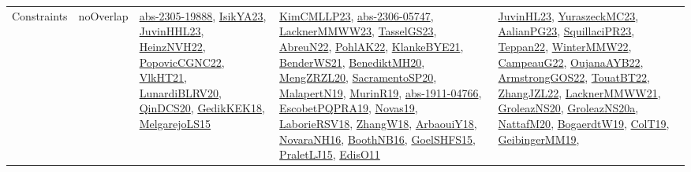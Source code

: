 {\begin{longtable}{lp{3cm}>{\raggedright}p{6cm}>{\raggedright}p{6cm}p{8cm}}
Constraints & noOverlap & \href{articles/abs-2305-19888.pdf}{abs-2305-19888}\cite{abs-2305-19888}, \href{articles/IsikYA23.pdf}{IsikYA23}\cite{IsikYA23}, \href{papers/JuvinHHL23.pdf}{JuvinHHL23}\cite{JuvinHHL23}, \href{articles/HeinzNVH22.pdf}{HeinzNVH22}\cite{HeinzNVH22}, \href{papers/PopovicCGNC22.pdf}{PopovicCGNC22}\cite{PopovicCGNC22}, \href{articles/VlkHT21.pdf}{VlkHT21}\cite{VlkHT21}, \href{articles/LunardiBLRV20.pdf}{LunardiBLRV20}\cite{LunardiBLRV20}, \href{articles/QinDCS20.pdf}{QinDCS20}\cite{QinDCS20}, \href{articles/GedikKEK18.pdf}{GedikKEK18}\cite{GedikKEK18}, \href{papers/MelgarejoLS15.pdf}{MelgarejoLS15}\cite{MelgarejoLS15} & \href{papers/KimCMLLP23.pdf}{KimCMLLP23}\cite{KimCMLLP23}, \href{articles/abs-2306-05747.pdf}{abs-2306-05747}\cite{abs-2306-05747}, \href{articles/LacknerMMWW23.pdf}{LacknerMMWW23}\cite{LacknerMMWW23}, \href{papers/TasselGS23.pdf}{TasselGS23}\cite{TasselGS23}, \href{articles/AbreuN22.pdf}{AbreuN22}\cite{AbreuN22}, \href{articles/PohlAK22.pdf}{PohlAK22}\cite{PohlAK22}, \href{papers/KlankeBYE21.pdf}{KlankeBYE21}\cite{KlankeBYE21}, \href{papers/BenderWS21.pdf}{BenderWS21}\cite{BenderWS21}, \href{articles/BenediktMH20.pdf}{BenediktMH20}\cite{BenediktMH20}, \href{articles/MengZRZL20.pdf}{MengZRZL20}\cite{MengZRZL20}, \href{articles/SacramentoSP20.pdf}{SacramentoSP20}\cite{SacramentoSP20}, \href{papers/MalapertN19.pdf}{MalapertN19}\cite{MalapertN19}, \href{papers/MurinR19.pdf}{MurinR19}\cite{MurinR19}, \href{articles/abs-1911-04766.pdf}{abs-1911-04766}\cite{abs-1911-04766}, \href{articles/EscobetPQPRA19.pdf}{EscobetPQPRA19}\cite{EscobetPQPRA19}, \href{articles/Novas19.pdf}{Novas19}\cite{Novas19}, \href{articles/LaborieRSV18.pdf}{LaborieRSV18}\cite{LaborieRSV18}, \href{articles/ZhangW18.pdf}{ZhangW18}\cite{ZhangW18}, \href{papers/ArbaouiY18.pdf}{ArbaouiY18}\cite{ArbaouiY18}, \href{articles/NovaraNH16.pdf}{NovaraNH16}\cite{NovaraNH16}, \href{papers/BoothNB16.pdf}{BoothNB16}\cite{BoothNB16}, \href{articles/GoelSHFS15.pdf}{GoelSHFS15}\cite{GoelSHFS15}, \href{papers/PraletLJ15.pdf}{PraletLJ15}\cite{PraletLJ15}, \href{papers/EdisO11.pdf}{EdisO11}\cite{EdisO11} & \href{papers/JuvinHL23.pdf}{JuvinHL23}\cite{JuvinHL23}, \href{papers/YuraszeckMC23.pdf}{YuraszeckMC23}\cite{YuraszeckMC23}, \href{papers/AalianPG23.pdf}{AalianPG23}\cite{AalianPG23}, \href{papers/SquillaciPR23.pdf}{SquillaciPR23}\cite{SquillaciPR23}, \href{papers/Teppan22.pdf}{Teppan22}\cite{Teppan22}, \href{papers/WinterMMW22.pdf}{WinterMMW22}\cite{WinterMMW22}, \href{articles/CampeauG22.pdf}{CampeauG22}\cite{CampeauG22}, \href{papers/OujanaAYB22.pdf}{OujanaAYB22}\cite{OujanaAYB22}, \href{papers/ArmstrongGOS22.pdf}{ArmstrongGOS22}\cite{ArmstrongGOS22}, \href{papers/TouatBT22.pdf}{TouatBT22}\cite{TouatBT22}, \href{papers/ZhangJZL22.pdf}{ZhangJZL22}\cite{ZhangJZL22}, \href{papers/LacknerMMWW21.pdf}{LacknerMMWW21}\cite{LacknerMMWW21}, \href{papers/GroleazNS20.pdf}{GroleazNS20}\cite{GroleazNS20}, \href{papers/GroleazNS20a.pdf}{GroleazNS20a}\cite{GroleazNS20a}, \href{papers/NattafM20.pdf}{NattafM20}\cite{NattafM20}, \href{papers/BogaerdtW19.pdf}{BogaerdtW19}\cite{BogaerdtW19}, \href{papers/ColT19.pdf}{ColT19}\cite{ColT19}, \href{papers/GeibingerMM19.pdf}{GeibingerMM19}\cite{GeibingerMM19}, 
\end{longtable}}
